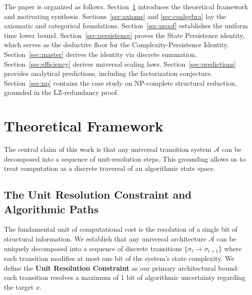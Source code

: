 \documentclass[12pt,a4paper]{article}
\theoremstyle{plain}
\theoremstyle{definition}
\begin{document}
The paper is organized as follows. Section~\ref{sec:framework} introduces the theoretical
framework and motivating synthesis. Sections~\ref{sec:axioms} and \ref{sec:coalgebra} lay the
axiomatic and categorical foundations. Section~\ref{sec:proof} establishes the uniform time
lower bound. Section~\ref{sec:persistence} proves the State Persistence identity, which serves
as the deductive floor for the Complexity-Persistence Identity. Section~\ref{sec:master} derives the identity via discrete summation. Section~\ref{sec:efficiency} derives universal scaling laws.
Section~\ref{sec:predictions} provides analytical predictions, including the factorization
conjecture. Section~\ref{sec:np} contains the case study on NP-complete structural reduction,
grounded in the LZ-redundancy proof.

\section{Theoretical Framework} \label{sec:framework}

The central claim of this work is that any universal transition system $\mathcal{A}$ can be 
decomposed into a sequence of unit-resolution steps. This grounding allows us to treat 
computation as a discrete traversal of an algorithmic state space.

\subsection{The Unit Resolution Constraint and Algorithmic Paths}

The fundamental unit of computational cost is the resolution of a single bit of structural
information. We establish that any universal architecture $\mathcal{A}$ can be uniquely 
decomposed into a sequence of discrete transitions $\{\sigma_t \to \sigma_{t+1}\}$ where each 
transition modifies at most one bit of the system's state complexity. We define the 
\textbf{Unit Resolution Constraint} as our primary architectural bound: each transition 
resolves a maximum of 1 bit of algorithmic uncertainty regarding the target $x$.
\end{document}
